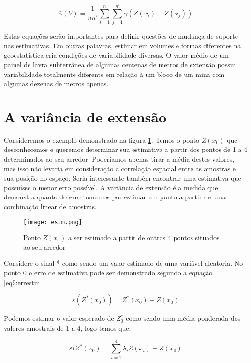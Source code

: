 \begin{equation}\label{eq8:Variogramamedio}
\bar{\gamma } (V) = \frac{1}{n n'}\sum_{i=1}^{n}\sum_{j=1}^{n'} \gamma (Z(x_{i})-Z(x_{j}))
\end{equation}

Estas equações serão importantes para definir questões de mudança de suporte nas estimativas. Em outras palavras, estimar em volumes e formas diferentes na geoestatística cria condições de variabilidade diversas. O valor médio de um painel de lavra subterrânea de algumas centenas de metros de extensão possui variabilidade totalmente diferente em relação à um bloco de um mina com algumas dezenas de metros apenas. 

\section{A variância de extensão}

Consideremos o exemplo demonstrado na figura \ref{estm}. Temos o ponto $Z(x_{0})$ que desconhecemos e queremos determinar sua estimativa a partir dos pontos de 1 a 4 determinados ao seu arredor. Poderíamos apenas tirar a média destes valores, mas isso não levaria em consideração a correlação espacial entre as amostras e sua posição no espaço. Seria interessante também encontrar uma estimativa que possuísse o menor erro possível. A variância de extensão é a medida que demonstra quanto do erro tomamos por estimar um ponto a partir de uma combinação linear de amostras. 

\begin{figure}[H]
\centering
\texttt{[image: estm.png]}	
\caption{Ponto $Z(x_{0})$ a ser estimado a partir de outros 4 pontos situados ao seu arredor}
\label{estm}
\end{figure}

Considere o sinal * como sendo um valor estimado de uma variável aleatória. No ponto 0 o erro de estimativa pode ser demonstrado segundo a equação \eqref{eq9:errestm}

\begin{equation}\label{eq9:errestm}
\varepsilon (Z^{*}(x_{0})) = Z^{*}(x_{0}) -Z(x_{0}) 
\end{equation}

Podemos estimar o valor esperado de $Z^{*}_{0}$ como sendo uma média ponderada dos valores amostrais de 1 a 4, logo temos que: 

\begin{equation}\label{eq9:errestm2}
\varepsilon (Z^{*}(x_{0}) = \sum_{i=1}^{4}\lambda _{i}Z(x_{i}) -Z(x_{0})   
\end{equation}

